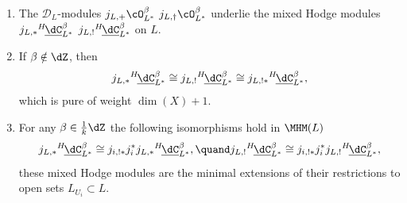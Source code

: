\begin{prop}\label{prop:CBetaHodgeExt}
\begin{enumerate}
\item
The $\mathscr{D}_{L}$\nobreakdash-mod\-ules $j_{L,+} \cO^\beta_{L^{*}}$ \resp $j_{L,\dag} \cO^\beta_{L^{*}}$ underlie the mixed Hodge modules $j_{L,*} {^{H\!}}\underline{\dC}^\beta_{L^*}$
\resp $j_{L,!} {^{H\!}}\underline{\dC}^\beta_{L^*}$ on $L$.

\item
If
$\beta\notin\dZ$, then
\[
j_{L,*} {^{H\!}}\underline{\dC}^\beta_{L^*} \cong j_{L,!} {^{H\!}}\underline{\dC}^\beta_{L^*}\cong j_{L,!*} {^{H\!}}\underline{\dC}^\beta_{L^*},
\]
which is pure of weight $\dim(X)+1$.

\item
For any $\beta\in\frac{1}{k}\dZ$ the following isomorphisms hold in $\MHM(L)$
\[
j_{L,*} {^{H\!}}\underline{\dC}^\beta_{L^*} \cong
j_{i,!*} j_i^{*} j_{L,*} {^{H\!}}\underline{\dC}^\beta_{L^*},
\quand
j_{L,!} {^{H\!}}\underline{\dC}^\beta_{L^*}\cong
j_{i,!*} j_i^{*} j_{L,!} {^{H\!}}\underline{\dC}^\beta_{L^*},
\]
\ie these mixed Hodge modules are the minimal extensions of their restrictions to open sets $L_{U_i}\subset L$.
\end{enumerate}
\end{prop}

